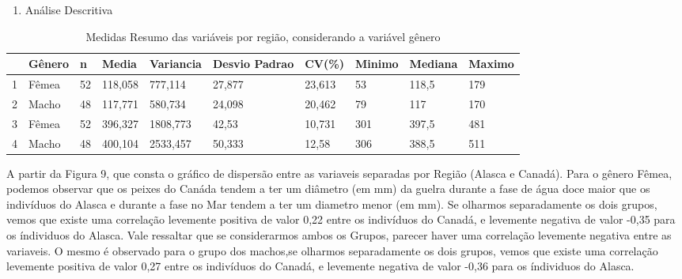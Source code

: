 \documentclass[10pt,portuguese,]{article}
\providecommand{\tightlist}{%
  \setlength{\itemsep}{0pt}\setlength{\parskip}{0pt}}
\begin{document}
\begin{enumerate}
\def\labelenumi{\arabic{enumi}.}
\setcounter{enumi}{3}
\tightlist
\item
  Análise Descritiva
\end{enumerate}

\begin{table}[!h]
\centering
\caption{Medidas Resumo das variáveis por região, considerando a variável gênero}
\bgroup
\def\arraystretch{1.5}
\begin{tabular}{rlllllllll}
  \toprule
 & Gênero & n & Media & Variancia & Desvio Padrao & CV(\%) & Minimo & Mediana & Maximo \\ \midrule
  \hline
1 & Fêmea & 52 & 118,058 & 777,114 & 27,877 & 23,613 & 53 & 118,5 & 179 \\ 
  2 & Macho & 48 & 117,771 & 580,734 & 24,098 & 20,462 & 79 & 117 & 170 \\ \midrule
  3 & Fêmea & 52 & 396,327 & 1808,773 & 42,53 & 10,731 & 301 & 397,5 & 481 \\ 
  4 & Macho & 48 & 400,104 & 2533,457 & 50,333 & 12,58 & 306 & 388,5 & 511 \\ \bottomrule
   \hline
\end{tabular}
\egroup
\end{table}

A partir da Figura 9, que consta o gráfico de dispersão entre as
variaveis separadas por Região (Alasca e Canadá). Para o gênero Fêmea,
podemos observar que os peixes do Canáda tendem a ter um diâmetro (em
mm) da guelra durante a fase de água doce maior que os indivíduos do
Alasca e durante a fase no Mar tendem a ter um diametro menor (em mm).
Se olharmos separadamente os dois grupos, vemos que existe uma
correlação levemente positiva de valor 0,22 entre os indivíduos do
Canadá, e levemente negativa de valor -0,35 para os índividuos do
Alasca. Vale ressaltar que se considerarmos ambos os Grupos, parecer
haver uma correlação levemente negativa entre as variaveis. O mesmo é
observado para o grupo dos machos,se olharmos separadamente os dois
grupos, vemos que existe uma correlação levemente positiva de valor 0,27
entre os indivíduos do Canadá, e levemente negativa de valor -0,36 para
os índividuos do Alasca.
\end{document}
